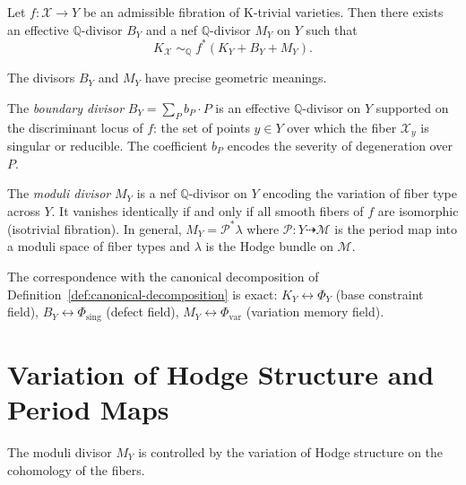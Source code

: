 \documentclass[11pt,openany]{book}
\begin{document}
\begin{theorem}
\label{thm:canonical-bundle-formula}
Let $f : \mathcal{X} \to Y$ be an admissible fibration of
K-trivial varieties.  Then there exists an effective
$\mathbb{Q}$-divisor $B_Y$ and a nef $\mathbb{Q}$-divisor
$M_Y$ on $Y$ such that
\[
  K_{\mathcal{X}} \;\sim_{\mathbb{Q}}\;
    f^*\!\left(K_Y + B_Y + M_Y\right).
\]
\end{theorem}

The divisors $B_Y$ and $M_Y$ have precise geometric
meanings.

\begin{definition}
The \emph{boundary divisor} $B_Y = \sum_P b_P \cdot P$ is
an effective $\mathbb{Q}$-divisor on $Y$ supported on the
discriminant locus of $f$: the set of points $y \in Y$
over which the fiber $\mathcal{X}_y$ is singular or
reducible.  The coefficient $b_P$ encodes the severity of
degeneration over $P$.
\end{definition}

\begin{definition}
The \emph{moduli divisor} $M_Y$ is a nef
$\mathbb{Q}$-divisor on $Y$ encoding the variation of
fiber type across $Y$.  It vanishes identically if and
only if all smooth fibers of $f$ are isomorphic
(isotrivial fibration).  In general, $M_Y = \mathcal{P}^*
\lambda$ where $\mathcal{P} : Y \dashrightarrow \mathcal{M}$
is the period map into a moduli space of fiber types and
$\lambda$ is the Hodge bundle on $\mathcal{M}$.
\end{definition}

\begin{remark}
The correspondence with the canonical decomposition of
Definition~\ref{def:canonical-decomposition} is exact:
$K_Y \leftrightarrow \Phi_Y$ (base constraint field),
$B_Y \leftrightarrow \Phi_{\mathrm{sing}}$ (defect field),
$M_Y \leftrightarrow \Phi_{\mathrm{var}}$ (variation
memory field).
\end{remark}

\section{Variation of Hodge Structure and Period Maps}
\label{sec:vhs}

The moduli divisor $M_Y$ is controlled by the variation of
Hodge structure on the cohomology of the fibers.
\end{document}

